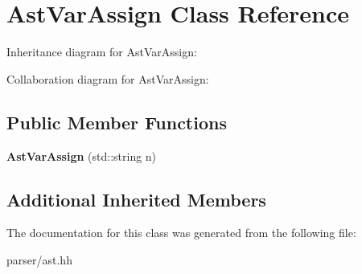\hypertarget{classAstVarAssign}{}\section{Ast\+Var\+Assign Class Reference}
\label{classAstVarAssign}


Inheritance diagram for Ast\+Var\+Assign\+:


Collaboration diagram for Ast\+Var\+Assign\+:
\subsection*{Public Member Functions}
\begin{DoxyCompactItemize}
\item 
\mbox{\label{classAstVarAssign_af54180064cff8a17890b1e07fef927f3}} 
{\bfseries Ast\+Var\+Assign} (std\+::string n)
\end{DoxyCompactItemize}
\subsection*{Additional Inherited Members}


The documentation for this class was generated from the following file\+:\begin{DoxyCompactItemize}
\item 
parser/ast.\+hh\end{DoxyCompactItemize}
